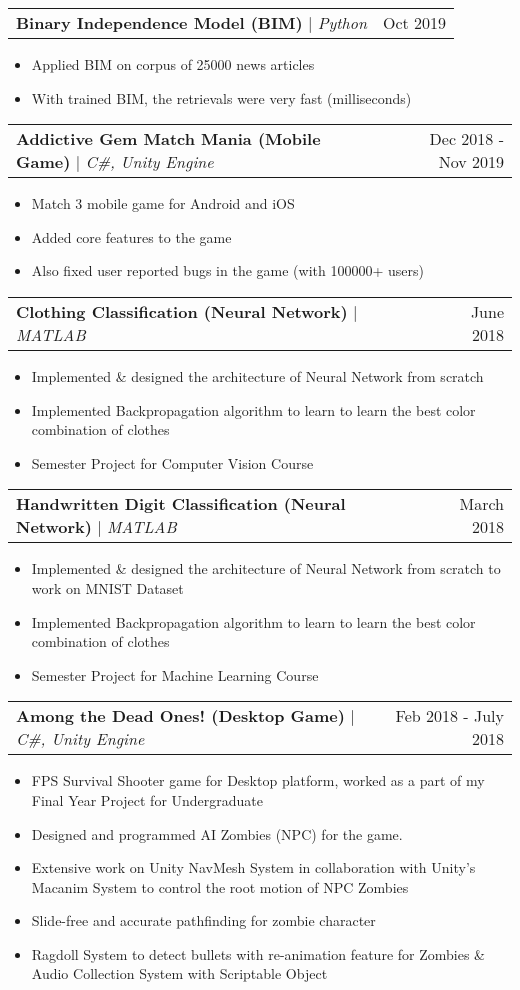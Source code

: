 \documentclass[letterpaper,11pt]{article}
\makeatletter
\newcommand{\resumeItem}[1]{
  \item\small{
    {#1 \vspace{-2pt}}
  }
}
\newcommand{\resumeProjectHeading}[2]{
    \item
    \begin{tabular*}{0.97\textwidth}{l@{\extracolsep{\fill}}r}
      \small#1 & #2 \\
    \end{tabular*}\vspace{-7pt}
}
\newcommand{\resumeItemListStart}{\begin{itemize}}
\newcommand{\resumeItemListEnd}{\end{itemize}\vspace{-5pt}}
\makeatother
\begin{document}
      \resumeProjectHeading
          {\textbf{Binary Independence Model (BIM)} $|$ \emph{Python}}{Oct 2019}
          \resumeItemListStart
            \resumeItem{Applied BIM on corpus of 25000 news articles}
            \resumeItem{With trained BIM, the retrievals were very fast (milliseconds)}
          \resumeItemListEnd 

      \resumeProjectHeading
          {\textbf{Addictive Gem Match Mania (Mobile Game)} $|$ \emph{C\#, Unity Engine}}{Dec 2018 - Nov 2019}
          \resumeItemListStart
            \resumeItem{Match 3 mobile game for Android and iOS}
            \resumeItem{Added core features to the game}
            \resumeItem{Also fixed user reported bugs in the game (with 100000+ users)}
          \resumeItemListEnd
          
      \resumeProjectHeading
          {\textbf{Clothing Classification (Neural Network)} $|$ \emph{MATLAB}}{June 2018}
          \resumeItemListStart
            \resumeItem{Implemented \& designed the architecture of Neural Network from scratch}
            \resumeItem{Implemented Backpropagation algorithm to learn to learn the best color combination of clothes}
            \resumeItem{Semester Project for Computer Vision Course}
          \resumeItemListEnd 

      \resumeProjectHeading
          {\textbf{Handwritten Digit Classification (Neural Network) } $|$ \emph{MATLAB}}{March 2018}
          \resumeItemListStart
            \resumeItem{Implemented \& designed the architecture of Neural Network from scratch to work on MNIST Dataset}
            \resumeItem{Implemented Backpropagation algorithm to learn to learn the best color combination of clothes}
            \resumeItem{Semester Project for Machine Learning Course}
          \resumeItemListEnd

      \resumeProjectHeading
          {\textbf{Among the Dead Ones! (Desktop Game)} $|$ \emph{C\#, Unity Engine}}{Feb 2018 - July 2018}
          \resumeItemListStart
            \resumeItem{FPS Survival Shooter game for Desktop platform, worked as a part of my Final Year Project for Undergraduate}
            \resumeItem{Designed and programmed AI Zombies (NPC) for the game.}
            \resumeItem{Extensive work on Unity NavMesh System in collaboration with Unity’s Macanim System to control the root motion of NPC Zombies}
            \resumeItem{Slide-free and accurate pathfinding for zombie character}
            \resumeItem{Ragdoll System to detect bullets with re-animation feature for Zombies \& Audio Collection System with Scriptable Object}
          \resumeItemListEnd 
\end{document}
